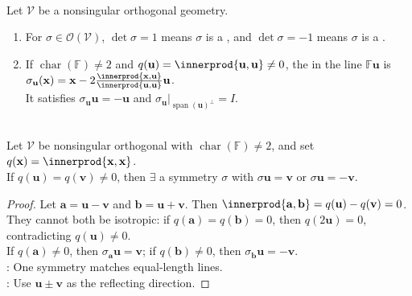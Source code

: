 \begin{definition} \label{def:orthogonal-symmetry-rotation-reflection} \\
Let $\mathcal{V}$ be a nonsingular orthogonal geometry.
\begin{enumerate}[label=(\roman*)]
\setlength{\itemsep}{0pt}
\item For $\sigma\in\mathcal{O}(\mathcal{V})$, $\det\sigma=1$ means $\sigma$ is a , and $\det\sigma=-1$ means $\sigma$ is a .
\item If $\operatorname{char}(\mathbb{F})\neq2$ and $q(\mathbf{u})=\innerprod{\mathbf{u},\mathbf{u}}\neq0$, the  in the line $\mathbb{F}\mathbf{u}$ is $\sigma_{\mathbf{u}}(\mathbf{x}) =\mathbf{x}-2\frac{\innerprod{\mathbf{x},\mathbf{u}}}{\innerprod{\mathbf{u},\mathbf{u}}}\mathbf{u}$.\\
It satisfies $\sigma_{\mathbf{u}}\mathbf{u}=-\mathbf{u}$ and $\sigma_{\mathbf{u}}|_{\operatorname{span}(\mathbf{u})^{\perp}}=I$.
\end{enumerate}
\end{definition}

\begin{proposition} \label{prop:symmetry-matches-equal-length-nonisotropic-vectors} \\
Let $\mathcal{V}$ be nonsingular orthogonal with $\operatorname{char}(\mathbb{F})\neq2$, and set $q(\mathbf{x})=\innerprod{\mathbf{x},\mathbf{x}}$.\\
If $q(\mathbf{u})=q(\mathbf{v})\neq0$,  then $\exists$ a symmetry $\sigma$ with $\sigma\mathbf{u}=\mathbf{v}$ or $\sigma\mathbf{u}=-\mathbf{v}$.
\begin{proof}
Let $\mathbf{a}=\mathbf{u}-\mathbf{v}$ and $\mathbf{b}=\mathbf{u}+\mathbf{v}$. Then $\innerprod{\mathbf{a},\mathbf{b}}=q(\mathbf{u})-q(\mathbf{v})=0$.\\
They cannot both be isotropic: if $q(\mathbf{a})=q(\mathbf{b})=0$, then $q(2\mathbf{u})=0$, contradicting $q(\mathbf{u})\neq0$.\\If $q(\mathbf{a})\neq0$, then $\sigma_{\mathbf{a}}\mathbf{u}=\mathbf{v}$; if $q(\mathbf{b})\neq0$, then $\sigma_{\mathbf{b}}\mathbf{u}=-\mathbf{v}$.\\
: One symmetry matches equal-length lines.\\
: Use $\mathbf{u}\pm\mathbf{v}$ as the reflecting direction.
\end{proof}
\end{proposition}

